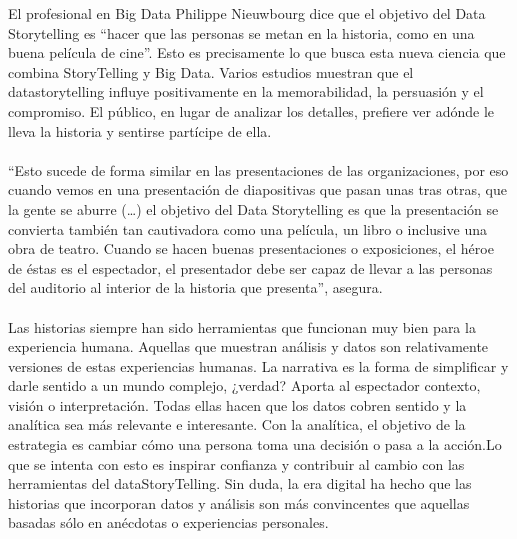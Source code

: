 \item{El profesional en Big Data Philippe Nieuwbourg dice que el objetivo del Data Storytelling es “hacer que las personas se metan en la historia, como en una buena película de cine”. Esto es precisamente lo que busca esta nueva ciencia que combina StoryTelling y Big Data. Varios estudios muestran que el datastorytelling influye positivamente en la memorabilidad, la persuasión y el compromiso. El público, en lugar de analizar los detalles, prefiere ver adónde le lleva la historia y sentirse partícipe de ella.
\\\\“Esto sucede de forma similar en las presentaciones de las organizaciones, por eso cuando vemos en una presentación de diapositivas que pasan unas tras otras, que la gente se aburre (…) el objetivo del Data Storytelling es que la presentación se convierta también tan cautivadora como una película, un libro o inclusive una obra de teatro. Cuando se hacen buenas presentaciones o exposiciones, el héroe de éstas es el espectador, el presentador debe ser capaz de llevar a las personas del auditorio al interior de la historia que presenta”, asegura.
\\\\Las historias siempre han sido herramientas que funcionan muy bien para la experiencia humana. Aquellas que muestran análisis y datos son relativamente versiones de estas experiencias humanas. La narrativa es la forma de simplificar y darle sentido a un mundo complejo, ¿verdad? Aporta al espectador contexto, visión o interpretación. Todas ellas hacen que los datos cobren sentido y la analítica sea más relevante e interesante. Con la analítica, el objetivo de la estrategia es cambiar cómo una persona toma una decisión o pasa a la acción.Lo que se intenta con esto es inspirar confianza y contribuir al cambio con las herramientas del dataStoryTelling. Sin duda, la era digital ha hecho que las historias que incorporan datos y análisis son más convincentes que aquellas basadas sólo en anécdotas o experiencias personales.
}


